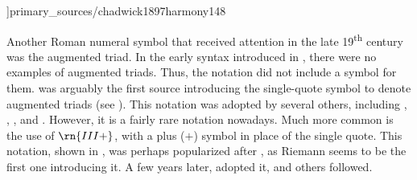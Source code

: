 \phdfigure[\gls{neapolitan} in
\textcite[p.~148]{chadwick1897harmony}]{primary_sources/chadwick1897harmony148}

Another Roman numeral symbol that received attention in the
late 19\textsuperscript{th} century was the augmented triad.
In the early syntax introduced in
\textcite{weber1817versuch}, there were no examples of
augmented triads. Thus, the notation did not include a
symbol for them. \textcite{richter1860lehrbuch} was arguably
the first source introducing the single-quote symbol to
denote augmented triads (see
). This
notation was adopted by several others, including
\textcite{jadassohn1883lehrbuch},
\textcite{broekhoven1889system}, \textcite{buwa1893schule},
and \textcite{shepard1896harmony}. However, it is a fairly
rare notation nowadays. Much more common is the use of
$\rn{III+}$, with a plus ($+$) symbol in place of the single
quote. This notation, shown in
, was
perhaps popularized after \textcite{riemann1890katechismus},
as Riemann seems to be the first one introducing it. A few
years later, \textcite{chadwick1897harmony} adopted it, and
others followed. 


